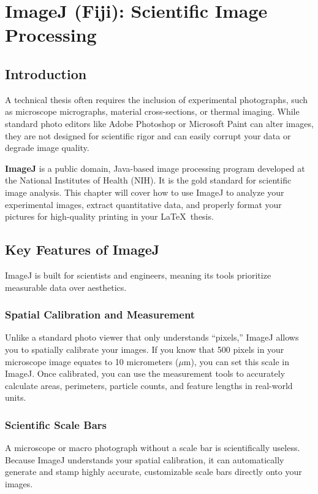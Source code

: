 \chapter{ImageJ (Fiji): Scientific Image Processing}\label{ch:imagej}
	\section{Introduction}\label{sec:ImageJIntroduction}
		A technical thesis often requires the inclusion of experimental photographs, such as microscope micrographs, material cross-sections, or thermal imaging. 
		While standard photo editors like Adobe Photoshop or Microsoft Paint can alter images, they are not designed for scientific rigor and can easily corrupt your data or degrade image quality.

		\textbf{ImageJ} is a public domain, Java-based image processing program developed at the National Institutes of Health (NIH). 
		It is the gold standard for scientific image analysis. 
		This chapter will cover how to use ImageJ to analyze your experimental images, extract quantitative data, and properly format your pictures for high-quality printing in your \LaTeX\ thesis.

	\section{Key Features of ImageJ}
		ImageJ is built for scientists and engineers, meaning its tools prioritize measurable data over aesthetics.

		\subsection{Spatial Calibration and Measurement}
			Unlike a standard photo viewer that only understands ``pixels,'' ImageJ allows you to spatially calibrate your images. 
			If you know that 500 pixels in your microscope image equates to 10 micrometers (\(\mu\)m), you can set this scale in ImageJ. 
			Once calibrated, you can use the measurement tools to accurately calculate areas, perimeters, particle counts, and feature lengths in real-world units.

		\subsection{Scientific Scale Bars}
			A microscope or macro photograph without a scale bar is scientifically useless. 
			Because ImageJ understands your spatial calibration, it can automatically generate and stamp highly accurate, customizable scale bars directly onto your images.

